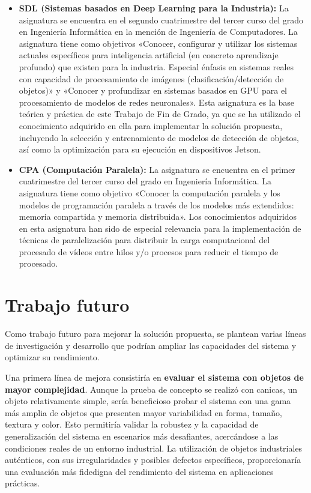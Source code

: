 \documentclass[11pt,spanish,listoffigures,listoftables]{tfgetsinf}
\begin{document}
\begin{itemize}
   \item \textbf{SDL (Sistemas basados en Deep Learning para la Industria):} La asignatura se encuentra en el segundo cuatrimestre del tercer curso del grado en Ingeniería Informática en la mención de Ingeniería de Computadores. La asignatura tiene como objetivos «Conocer, configurar y utilizar los sistemas actuales específicos para inteligencia artificial (en concreto aprendizaje profundo) que existen para la industria. Especial énfasis en sistemas reales con capacidad de procesamiento de imágenes (clasificación/detección de objetos)» y «Conocer y profundizar en sistemas basados en GPU para el procesamiento de modelos de redes neuronales». Esta asignatura es la base teórica y práctica de este Trabajo de Fin de Grado, ya que se ha utilizado el conocimiento adquirido en ella para implementar la solución propuesta, incluyendo la selección y entrenamiento de modelos de detección de objetos, así como la optimización para su ejecución en dispositivos Jetson.
   
   \item \textbf{CPA (Computación Paralela):} La asignatura se encuentra en el primer cuatrimestre del tercer curso del grado en Ingeniería Informática. La asignatura tiene como objetivo «Conocer la computación paralela y los modelos de programación paralela a través de los modelos más extendidos: memoria compartida y memoria distribuida». Los conocimientos adquiridos en esta asignatura han sido de especial relevancia para la implementación de técnicas de paralelización para distribuir la carga computacional del procesado de vídeos entre hilos y/o procesos para reducir el tiempo de procesado.
\end{itemize}



\section{Trabajo futuro}

Como trabajo futuro para mejorar la solución propuesta, se plantean varias líneas de investigación y desarrollo que podrían ampliar las capacidades del sistema y optimizar su rendimiento.

Una primera línea de mejora consistiría en \textbf{evaluar el sistema con objetos de mayor complejidad}. Aunque la prueba de concepto se realizó con canicas, un objeto relativamente simple, sería beneficioso probar el sistema con una gama más amplia de objetos que presenten mayor variabilidad en forma, tamaño, textura y color. Esto permitiría validar la robustez y la capacidad de generalización del sistema en escenarios más desafiantes, acercándose a las condiciones reales de un entorno industrial. La utilización de objetos industriales auténticos, con sus irregularidades y posibles defectos específicos, proporcionaría una evaluación más fidedigna del rendimiento del sistema en aplicaciones prácticas.
\end{document}
